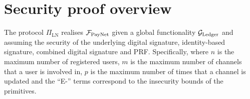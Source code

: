 \section{Security proof overview}
\label{sec:ov-security-proof}
  \begin{theorem}
    The protocol $\Pi_{\mathrm{LN}}$ realises $\mathcal{F}_{\mathrm{PayNet}}$ given a global
    functionality $\mathcal{G}_{\mathrm{Ledger}}$ and assuming the security of the underlying digital
    signature, identity-based signature, combined digital signature and PRF.
    Specifically,
    \label{theorem:simulation}
    where $n$ is the maximum number of registered users, $m$ is the maximum
    number of channels that a user is involved in, $p$ is the maximum number of
    times that a channel is updated and the ``E-'' terms correspond to the
    insecurity bounds of the primitives.
  \end{theorem}

